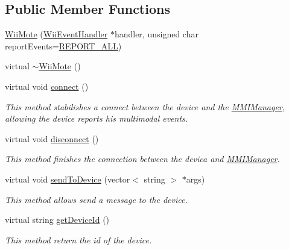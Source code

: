 \subsection*{Public Member Functions}
\begin{DoxyCompactItemize}
\item 
\hyperlink{classbr_1_1ufscar_1_1lince_1_1mmi_1_1wii_1_1WiiMote_a286176220d743bd02ee02b35970916a3}{WiiMote} (\hyperlink{classbr_1_1ufscar_1_1lince_1_1mmi_1_1wii_1_1WiiEventHandler}{WiiEventHandler} $\ast$handler, unsigned char reportEvents=\hyperlink{classbr_1_1ufscar_1_1lince_1_1mmi_1_1wii_1_1WiiMote_a96872905a37ca4eb5902ea220217a54f}{REPORT\_\-ALL})
\item 
virtual \hyperlink{classbr_1_1ufscar_1_1lince_1_1mmi_1_1wii_1_1WiiMote_aa0a674eed3f5c4cebf761682dbcdf6e8}{$\sim$WiiMote} ()
\item 
virtual void \hyperlink{classbr_1_1ufscar_1_1lince_1_1mmi_1_1wii_1_1WiiMote_a15e0d1b2ac9fde887e870aeb597c0dc8}{connect} ()
\begin{DoxyCompactList}\small\item\em This method stabilishes a connect between the device and the \hyperlink{classbr_1_1ufscar_1_1lince_1_1mmi_1_1MMIManager}{MMIManager}, allowing the device reports his multimodal events. \item\end{DoxyCompactList}\item 
virtual void \hyperlink{classbr_1_1ufscar_1_1lince_1_1mmi_1_1wii_1_1WiiMote_a44aa8cf98660392a91045e4892a9e65a}{disconnect} ()
\begin{DoxyCompactList}\small\item\em This method finishes the connection between the devica and \hyperlink{classbr_1_1ufscar_1_1lince_1_1mmi_1_1MMIManager}{MMIManager}. \item\end{DoxyCompactList}\item 
virtual void \hyperlink{classbr_1_1ufscar_1_1lince_1_1mmi_1_1wii_1_1WiiMote_acd1fe851dd5909ee3cbd0fa23a070f0e}{sendToDevice} (vector$<$ string $>$ $\ast$args)
\begin{DoxyCompactList}\small\item\em This method allows send a message to the device. \item\end{DoxyCompactList}\item 
virtual string \hyperlink{classbr_1_1ufscar_1_1lince_1_1mmi_1_1wii_1_1WiiMote_a125dc3805711f4b5fa9327ebf719e035}{getDeviceId} ()
\begin{DoxyCompactList}\small\item\em This method return the id of the device. \item\end{DoxyCompactList}\item 

\end{DoxyCompactItemize}
